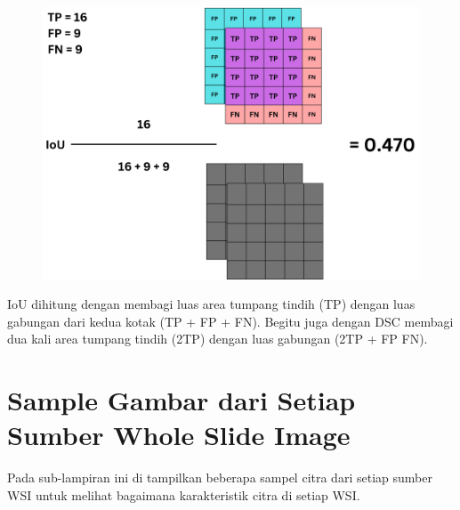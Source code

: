   \begin{figure}[H]
 	\centering
 	\includegraphics[scale=.2]{gambar/lampiran/IoU.png}
 \end{figure} 
 
 IoU dihitung dengan membagi luas area tumpang tindih (TP) dengan luas gabungan dari kedua kotak (TP + FP + FN). Begitu juga dengan DSC membagi dua kali area tumpang tindih (2TP) dengan luas gabungan (2TP + FP FN). 
 

\section{Sample Gambar dari Setiap Sumber Whole Slide Image}

Pada sub-lampiran ini di tampilkan beberapa sampel citra dari setiap sumber WSI untuk melihat bagaimana karakteristik citra di setiap WSI.

